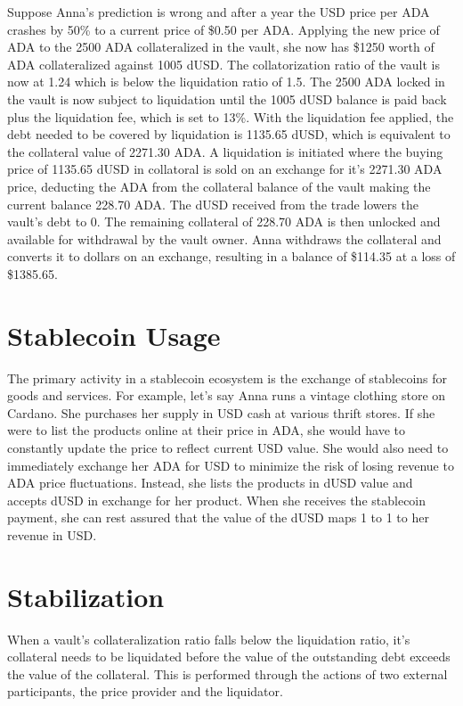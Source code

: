 \documentclass[12pt]{article}
\begin{document}
Suppose Anna's prediction is wrong and after a year the USD price per ADA crashes by 50\% to a current price of \$0.50 per ADA. Applying the new price of ADA to the 2500 ADA collateralized in the vault, she now has \$1250 worth of ADA collateralized against 1005 dUSD. The collatorization ratio of the vault is now at 1.24 which is below the liquidation ratio of 1.5. The 2500 ADA locked in the vault is now subject to liquidation until the 1005 dUSD balance is paid back plus the liquidation fee, which is set to 13\%. With the liquidation fee applied, the debt needed to be covered by liquidation is 1135.65 dUSD, which is equivalent to the collateral value of 2271.30 ADA. A liquidation is initiated where the buying price of 1135.65 dUSD in collatoral is sold on an exchange for it's 2271.30 ADA price, deducting the ADA from the collateral balance of the vault making the current balance 228.70 ADA. The dUSD received from the trade lowers the vault's debt to 0. The remaining collateral of 228.70 ADA is then unlocked and available for withdrawal by the vault owner. Anna withdraws the collateral and converts it to dollars on an exchange, resulting in a balance of \$114.35 at a loss of \$1385.65.

\section{Stablecoin Usage}

The primary activity in a stablecoin ecosystem is the exchange of stablecoins for goods and services. For example, let's say Anna runs a vintage clothing store on Cardano. She purchases her supply in USD cash at various thrift stores. If she were to list the products online at their price in ADA, she would have to constantly update the price to reflect current USD value. She would also need to immediately exchange her ADA for USD to minimize the risk of losing revenue to ADA price fluctuations. Instead, she lists the products in dUSD value and accepts dUSD in exchange for her product. When she receives the stablecoin payment, she can rest assured that the value of the dUSD maps 1 to 1 to her revenue in USD.

\section{Stabilization}
When a vault's collateralization ratio falls below the liquidation ratio, it's collateral needs to be liquidated before the value of the outstanding debt exceeds the value of the collateral. This is performed through the actions of two external participants, the price provider and the liquidator.
\end{document}
